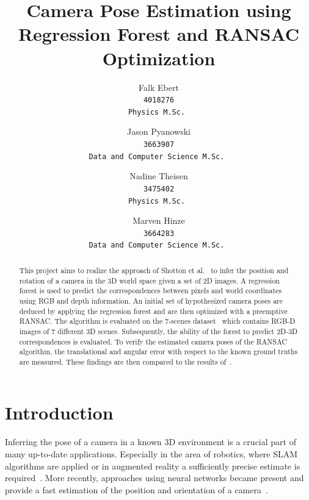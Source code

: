 \documentclass[final]{cvpr}
\begin{document}
\title{Camera Pose Estimation using Regression Forest and RANSAC Optimization}

\author{Falk Ebert\\
\tt 4018276\\
{\tt\small Physics M.Sc.}
\and
Jason Pyanowski\\
\tt 3663907\\
{\tt\small Data and Computer Science M.Sc.}
\and
Nadine Theisen\\
\tt 3475402\\
{\tt\small Physics M.Sc.}
\and
Marven Hinze\\
\tt 3664283\\
{\tt\small Data and Computer Science M.Sc.}
}

\maketitle


\begin{abstract}
This project aims to realize the approach of Shotton et al.~\cite{shotton2013} to infer the position and rotation of a camera
in the 3D world space given a set of 2D images. A regression forest is used to predict the correspondences between 
pixels and world coordinates using RGB and depth information. An initial set of hypothesized camera
poses are deduced by applying the regression forest and are then optimized with a preemptive RANSAC. The algorithm 
is evaluated on the 7-scenes dataset~\cite{glocker2013} which contains RGB-D images of 7 different 3D scenes. Subsequently, the ability of the forest to predict 2D-3D 
correspondences is evaluated. To verify the estimated camera poses of the RANSAC algorithm, the translational and 
angular error with respect to the known ground truths are measured. These findings are then compared to the results
of~\cite{shotton2013}. 
\end{abstract}

\section{Introduction}
Inferring the pose of a camera in a known 3D environment is a crucial part of many up-to-date applications.
Especially in the area of robotics, where \ac{SLAM} algorithms are applied or in augmented reality a sufficiently precise 
estimate is required~\cite{shotton2013}. More recently, approaches using neural networks became present and provide
a fast estimation of the position and orientation of a camera~\cite{Blanton2020}. 
\end{document}
